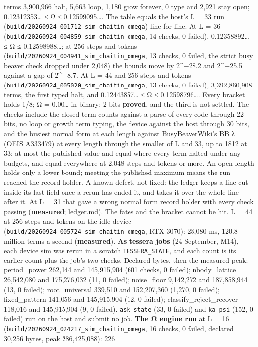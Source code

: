 \begin{description}
terms 3,900,966 halt, 5,663 loop, 1,180 grow forever, 0 type and 2,921 stay open; 0.12312353… ≤ Ω ≤ 0.12599095…. The table equals the host's L = 33 run (\texttt{build/\allowbreak{}20260924\_\allowbreak{}001712\_\allowbreak{}sim\_\allowbreak{}chaitin\_\allowbreak{}omega}) line for line. At L = 36 (\texttt{build/\allowbreak{}20260924\_\allowbreak{}004859\_\allowbreak{}sim\_\allowbreak{}chaitin\_\allowbreak{}omega}, 14 checks, 0 failed), 0.12358892… ≤ Ω ≤ 0.12598988…; at 256 steps and tokens (\texttt{build/\allowbreak{}20260924\_\allowbreak{}004941\_\allowbreak{}sim\_\allowbreak{}chaitin\_\allowbreak{}omega}, 13 checks, 0 failed, the strict busy beaver check dropped under 2,048) the bounds move by 2\textasciicircum{}−28.2 and 2\textasciicircum{}−25.5 against a gap of 2\textasciicircum{}−8.7. At L = 44 and 256 steps and tokens (\texttt{build/\allowbreak{}20260924\_\allowbreak{}005020\_\allowbreak{}sim\_\allowbreak{}chaitin\_\allowbreak{}omega}, 13 checks, 0 failed), 3,392,860,908 terms, the first typed halt, and 0.12443857… ≤ Ω ≤ 0.12598796…. Every bracket holds 1/8; Ω = 0.00… in binary: 2 bits \textbf{proved}, and the third is not settled. The checks include the closed-term counts against a parse of every code through 22 bits, no loop or growth term typing, the device against the host through 30 bits, and the busiest normal form at each length against BusyBeaverWiki's BB λ (OEIS A333479) at every length through the smaller of L and 33, up to 1812 at 33: at most the published value and equal where every term halted under any budgets, and equal everywhere at 2,048 steps and tokens or more. An open length holds only a lower bound; meeting the published maximum means the run reached the record holder. A known defect, not fixed: the ledger keeps a line cut inside its last field once a rerun has ended it, and takes it over the whole line after it. At L = 31 that gave a wrong normal form record holder with every check passing (\textbf{measured}; \hyperref[chap:ledger]{ledger.md}). The fates and the bracket cannot be hit. L = 44 at 256 steps and tokens on the idle device (\texttt{build/\allowbreak{}20260924\_\allowbreak{}005724\_\allowbreak{}sim\_\allowbreak{}chaitin\_\allowbreak{}omega}, RTX 3070): 28,080 ms, 120.8 million terms a second (\textbf{measured}). \textbf{As tessera jobs} (24 September, M14), each device sim was rerun in a scratch \texttt{TESSERA\_\allowbreak{}STATE}, and each count is its earlier count plus the job's two checks. Declared bytes, then the measured peak: period\_\allowbreak{}power 262,144 and 145,915,904 (601 checks, 0 failed); nbody\_\allowbreak{}lattice 26,542,080 and 175,276,032 (11, 0 failed); noise\_\allowbreak{}floor 9,142,272 and 187,858,944 (13, 0 failed); root\_\allowbreak{}universal 339,510 and 152,207,360 (1,270, 0 failed); fixed\_\allowbreak{}pattern 141,056 and 145,915,904 (12, 0 failed); classify\_\allowbreak{}reject\_\allowbreak{}recover 118,016 and 145,915,904 (9, 0 failed). \texttt{ask\_\allowbreak{}state} (33, 0 failed) and \texttt{ka\_\allowbreak{}psi} (152, 0 failed) run on the host and submit no job. \textbf{The Ω engine run} at L = 16 (\texttt{build/\allowbreak{}20260924\_\allowbreak{}024217\_\allowbreak{}sim\_\allowbreak{}chaitin\_\allowbreak{}omega}, 16 checks, 0 failed, declared 30,256 bytes, peak 286,425,088): 226 
\end{description}
